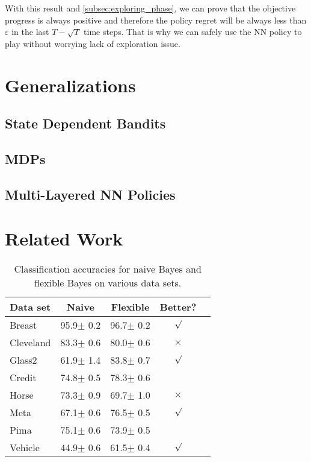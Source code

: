 With this result and \cref{subsec:exploring_phase}, we can prove that the objective progress is always positive and therefore the policy regret will be always less than $\varepsilon$ in the last $T - \sqrt{T}$ time steps. That is why we can safely use the NN policy to play without worrying lack of exploration issue.

\section{Generalizations}

\subsection{State Dependent Bandits}

\subsection{MDPs}

\subsection{Multi-Layered NN Policies}

\section{Related Work}




\nocite{langley00}
\fi

\begin{table}[t]
\caption{Classification accuracies for naive Bayes and flexible
Bayes on various data sets.}
\label{sample-table}
\vskip 0.15in
\begin{center}
\begin{small}
\begin{sc}
\begin{tabular}{lcccr}
\toprule
Data set & Naive & Flexible & Better? \\
\midrule
Breast    & 95.9$\pm$ 0.2& 96.7$\pm$ 0.2& $\surd$ \\
Cleveland & 83.3$\pm$ 0.6& 80.0$\pm$ 0.6& $\times$\\
Glass2    & 61.9$\pm$ 1.4& 83.8$\pm$ 0.7& $\surd$ \\
Credit    & 74.8$\pm$ 0.5& 78.3$\pm$ 0.6&         \\
Horse     & 73.3$\pm$ 0.9& 69.7$\pm$ 1.0& $\times$\\
Meta      & 67.1$\pm$ 0.6& 76.5$\pm$ 0.5& $\surd$ \\
Pima      & 75.1$\pm$ 0.6& 73.9$\pm$ 0.5&         \\
Vehicle   & 44.9$\pm$ 0.6& 61.5$\pm$ 0.4& $\surd$ \\
\bottomrule
\end{tabular}
\end{sc}
\end{small}
\end{center}
\vskip -0.1in
\end{table}
\fi